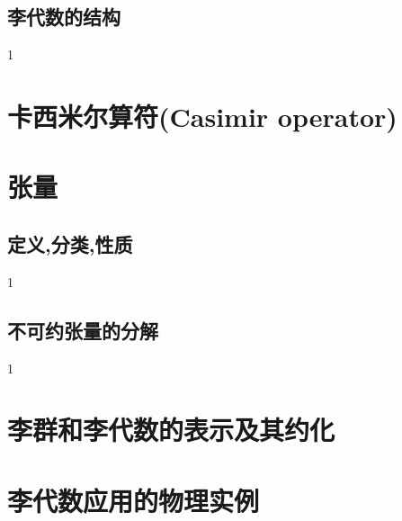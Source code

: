 \subsection{李代数的结构}
1
\section{卡西米尔算符(Casimir operator)}
\section{张量}
\subsection{定义,分类,性质}
1
\subsection{不可约张量的分解}
1
\section{李群和李代数的表示及其约化}
	
\section{李代数应用的物理实例}
	
\ifx\allfiles\undefined

	\else
	\fi
